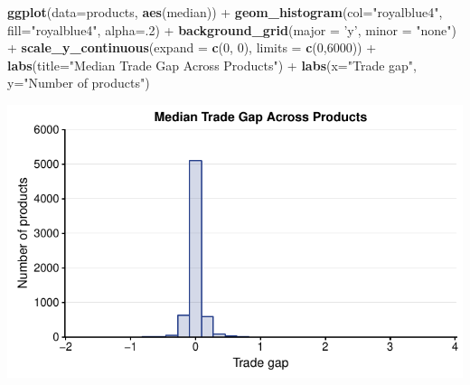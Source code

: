 \documentclass[10pt,]{article}
\newenvironment{Shaded}{\begin{snugshade}}{\end{snugshade}}
\newcommand{\KeywordTok}[1]{\textcolor[rgb]{0.13,0.29,0.53}{\textbf{{#1}}}}
\newcommand{\DataTypeTok}[1]{\textcolor[rgb]{0.13,0.29,0.53}{{#1}}}
\newcommand{\DecValTok}[1]{\textcolor[rgb]{0.00,0.00,0.81}{{#1}}}
\newcommand{\StringTok}[1]{\textcolor[rgb]{0.31,0.60,0.02}{{#1}}}
\newcommand{\NormalTok}[1]{{#1}}
\begin{document}
\begin{Shaded}
\begin{Highlighting}[]
\KeywordTok{ggplot}\NormalTok{(}\DataTypeTok{data=}\NormalTok{products, }\KeywordTok{aes}\NormalTok{(median)) +}
\StringTok{  }\KeywordTok{geom_histogram}\NormalTok{(}\DataTypeTok{col=}\StringTok{"royalblue4"}\NormalTok{,}
                 \DataTypeTok{fill=}\StringTok{"royalblue4"}\NormalTok{,}
                 \DataTypeTok{alpha=}\NormalTok{.}\DecValTok{2}\NormalTok{) +}
\StringTok{  }\KeywordTok{background_grid}\NormalTok{(}\DataTypeTok{major =} \StringTok{'y'}\NormalTok{, }\DataTypeTok{minor =} \StringTok{"none"}\NormalTok{) +}
\StringTok{  }\KeywordTok{scale_y_continuous}\NormalTok{(}\DataTypeTok{expand =} \KeywordTok{c}\NormalTok{(}\DecValTok{0}\NormalTok{, }\DecValTok{0}\NormalTok{), }\DataTypeTok{limits =} \KeywordTok{c}\NormalTok{(}\DecValTok{0}\NormalTok{,}\DecValTok{6000}\NormalTok{)) +}
\StringTok{  }\KeywordTok{labs}\NormalTok{(}\DataTypeTok{title=}\StringTok{"Median Trade Gap Across Products"}\NormalTok{) +}
\StringTok{  }\KeywordTok{labs}\NormalTok{(}\DataTypeTok{x=}\StringTok{"Trade gap"}\NormalTok{, }\DataTypeTok{y=}\StringTok{"Number of products"}\NormalTok{)}
\end{Highlighting}
\end{Shaded}

\begin{center}\includegraphics{Figs/value_time-3} \end{center}
\end{document}
